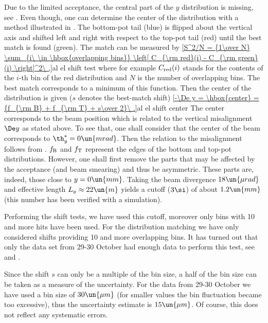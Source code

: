 Due to the limited acceptance, the central part of the $y$ distribution is missing, see . Even though, one can determine the center of the distribution with a method illustrated in . The bottom-pot tail (blue) is flipped about the vertical axis and shifted left and right with respect to the top-pot tail (red) until the best match is found (green). The match can be measured by
\eqref{S^2/N = {1\over N} \sum_{i\ \in \hbox{overlapping bins}} \left[ C_{\rm red}(i) - C_{\rm green}(i) \right]^2\ ,}{al el shift test}
where for example $C_{\rm red}(i)$ stands for the contents of the $i$-th bin of the red distribution and $N$ is the number of overlapping bins. The best match corresponds to a minimum of this function. Then the center of the distribution is given ($s$ denotes the best-match shift)
\eqref{-\De y = \hbox{center} = {f_{\rm B} + f_{\rm T} + s\over 2}\ .}{al el shift center}
The center corresponds to the beam position which is related to the vertical misalignment $\De y$ as stated above. To see that, one shall consider that the center of the beam corresponds to $\th_y^* = 0\un{mrad}$. Then the relation to the misalignment follows from . $f_{\rm B}$ and $f_{\rm T}$ represent the edges of the bottom and top-pot distributions. However, one shall first remove the parts that may be affected by the acceptance (and beam smearing) and thus be asymmetric. These parts are, indeed, those close to $y=0\un{mm}$. Taking the beam divergence $18\un{\mu rad}$ and effective length $L_y\approx 22\un{m}$ yields a cutoff ($3\si$) of about $1.2\un{mm}$ (this number has been verified with a  simulation).

Performing the shift tests, we have used this cutoff, moreover only bins with 10 and more hits have been used. For the distribution matching we have only considered shifts providing 10 and more overlapping bins. It has turned out that only the data set from 29-30 October had enough data to perform this test, see  and .


Since the shift $s$ can only be a multiple of the bin size, a half of the bin size can be taken as a measure of the uncertainty. For the data from 29-30 October we have used a bin size of $30\un{\mu m}$ (for smaller values the bin fluctuation became too excessive), thus the uncertainty estimate is $15\un{\mu m}$. Of course, this does not reflect any systematic errors. 

